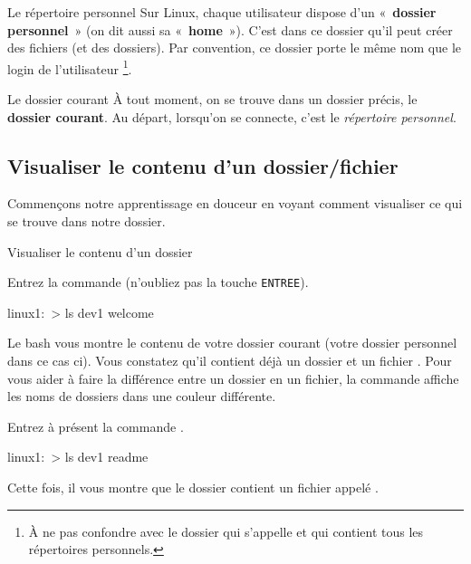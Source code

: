 \documentclass[a4paper,11pt]{style-esi/td}
\begin{document}
		\begin{theorie}{Le répertoire personnel}
			Sur Linux, chaque utilisateur dispose d'un « \textbf{dossier personnel} » 
			(on dit aussi sa « \textbf{home} »). 
			C'est dans ce dossier qu'il peut créer des fichiers (et des dossiers). 
			Par convention, ce dossier porte le même nom que le login de l'utilisateur%
			\footnote{%
				À ne pas confondre avec le dossier qui s'appelle 
				et qui contient tous les répertoires personnels.
			}.
		\end{theorie}

		\begin{theorie}{Le dossier courant}
			À tout moment,
			on se trouve dans un dossier précis, le \og{}\textbf{dossier courant}\fg{}. 
			Au départ, lorsqu'on se connecte, c’est le \emph{répertoire personnel}.
		\end{theorie}

	\subsection{Visualiser le contenu d'un dossier/fichier}

		Commençons notre apprentissage en douceur
		en voyant comment visualiser ce qui se trouve dans notre dossier.

		\begin{Experience}{Visualiser le contenu d'un dossier}
			\vspace{-1em}
			\begin{steps}
			\item 
				Entrez la commande  (n'oubliez pas la touche \verb|ENTREE|).				
				\begin{Console}
					linux1:~> ls
					dev1 welcome
				\end{Console}				
				Le bash vous montre le contenu de votre dossier courant
				(votre dossier personnel dans ce cas ci).
				Vous constatez qu'il contient déjà un dossier 
				et un fichier .
				Pour vous aider à faire la différence
				entre un dossier en un fichier, 
				la commande 
				affiche les noms de dossiers dans une couleur différente.
			\item 
				Entrez à présent la commande .
				\begin{Console}
					linux1:~> ls dev1
					readme
				\end{Console}				
				Cette fois, il vous montre que le dossier  contient
				un fichier appelé .
			\end{steps}			
		\end{Experience}
\end{document}
